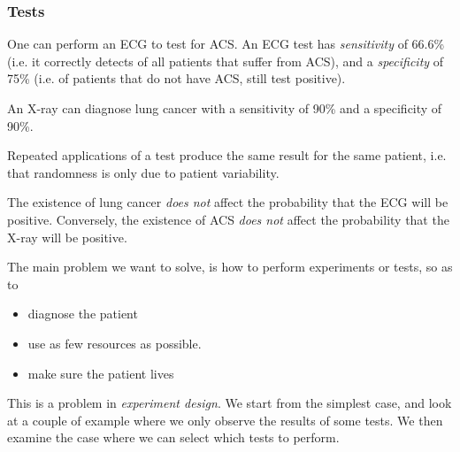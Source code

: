 \documentclass[twoside,a4paper]{article}
\begin{document}
\subsubsection{Tests}
One can perform an ECG to test for ACS. An ECG test has \emph{sensitivity} of 66.6\% (i.e. it correctly detects  of all patients that suffer from ACS), and a \emph{specificity} of 75\% (i.e.  of patients that do not have ACS, still test positive). 

An X-ray can diagnose lung cancer with a sensitivity of 90\% and a specificity of 90\%. 

\begin{assumption}
  Repeated applications of a test produce the same result for the same
  patient, i.e. that randomness is only due to patient variability.
\end{assumption}

\begin{assumption}
  The existence of lung cancer \emph{does not} affect the probability that the ECG will be positive. Conversely, the existence of ACS \emph{does not} affect the probability that the X-ray will be positive.
\end{assumption}

The main problem we want to solve, is how to perform experiments or
tests, so as to
\begin{itemize}
\item diagnose the patient
\item use as few resources as possible.
\item make sure the patient lives
\end{itemize}
This is a problem in \emph{experiment design}. We start from the simplest case, and look at a couple of example where we only observe the results of some tests.
We then examine the case where we can select which tests to perform.
\end{document}
